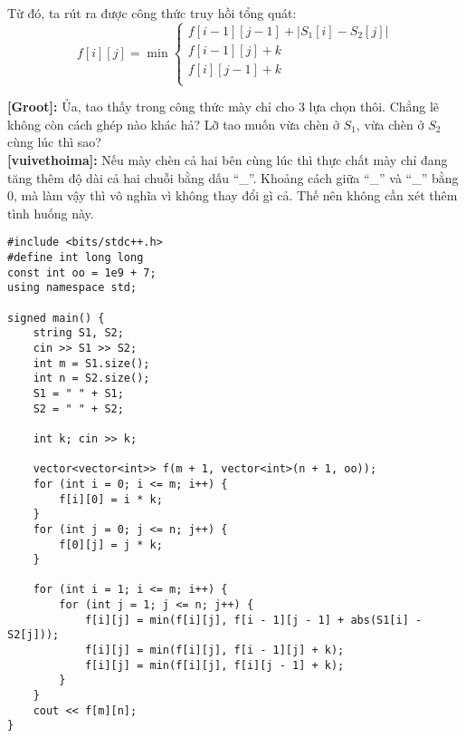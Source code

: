 Từ đó, ta rút ra được công thức truy hồi tổng quát:
\[
f[i][j] = \min
\begin{cases}
    f[i - 1][j - 1] + |S_1[i] - S_2[j]| \\
    f[i - 1][j] + k \\
    f[i][j - 1] + k \\
\end{cases}
\]


\textbf{[Groot]:} Ủa, tao thấy trong công thức mày chỉ cho 3 lựa chọn thôi. 
Chẳng lẽ không còn cách ghép nào khác hả?  
Lỡ tao muốn vừa chèn ở $S_1$, vừa chèn ở $S_2$ cùng lúc thì sao?\\

\textbf{[vuivethoima]:} Nếu mày chèn cả hai bên cùng lúc thì 
thực chất mày chỉ đang tăng thêm độ dài cả hai chuỗi bằng dấu ``\_''. 
Khoảng cách giữa ``\_'' và ``\_'' bằng 0, 
mà làm vậy thì vô nghĩa vì không thay đổi gì cả.  
Thế nên không cần xét thêm tình huống này.

\begin{lstlisting}[title=\centering \textbf{Cài đặt}]
#include <bits/stdc++.h>
#define int long long
const int oo = 1e9 + 7;
using namespace std;

signed main() {
    string S1, S2;
    cin >> S1 >> S2;
    int m = S1.size();
    int n = S2.size();
    S1 = " " + S1;
    S2 = " " + S2;

    int k; cin >> k;

    vector<vector<int>> f(m + 1, vector<int>(n + 1, oo));
    for (int i = 0; i <= m; i++) {
        f[i][0] = i * k;
    }
    for (int j = 0; j <= n; j++) {
        f[0][j] = j * k;
    }

    for (int i = 1; i <= m; i++) {
        for (int j = 1; j <= n; j++) {
            f[i][j] = min(f[i][j], f[i - 1][j - 1] + abs(S1[i] - S2[j]));
            f[i][j] = min(f[i][j], f[i - 1][j] + k);
            f[i][j] = min(f[i][j], f[i][j - 1] + k);
        }
    }
    cout << f[m][n];
}

\end{lstlisting}

